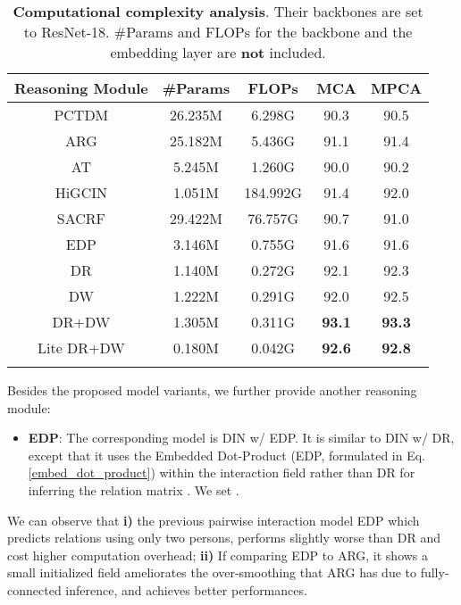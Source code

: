 \documentclass[10pt,twocolumn,letterpaper]{article}
\begin{document}
\begin{table}[t]
\small
  \centering
    \begin{tabular}{c|cccc}
    \Xhline{1.0pt}
    {Reasoning Module} & \#Params & FLOPs & MCA & MPCA \\
    \hline\hline
    PCTDM \cite{yan2018pctdm} & 26.235M  & 6.298G  & 90.3  & 90.5  \\
    ARG \cite{wu2019learning}   & 25.182M  & 5.436G  & 91.1  & 91.4  \\
    AT \cite{gavrilyuk2020actor} & 5.245M  & 1.260G  & 90.0  & 90.2  \\
    HiGCIN\cite{yan2020higcin} & 1.051M  & 184.992G  & 91.4  & 92.0  \\
    SACRF \cite{pramono2020eccvempowering} & 29.422M  & 76.757G  & 90.7  & 91.0  \\
    \hline
    EDP    & 3.146M  & 0.755G  & 91.6  & 91.6  \\
    DR    & 1.140M  & 0.272G  & 92.1  & 92.3  \\
    DW   & 1.222M  & 0.291G  & 92.0  & 92.5  \\
    DR+DW & 1.305M  & 0.311G  & \textbf{93.1} & \textbf{93.3} \\
    Lite DR+DW & 0.180M  & 0.042G  & \textbf{92.6}  & \textbf{92.8}  \\
    \Xhline{1.0pt}
    \end{tabular}\vspace{0.2cm}
  \caption{\textbf{Computational complexity analysis}. Their backbones are set to ResNet-18. \#Params and FLOPs for the backbone and the embedding layer are \textbf{not} included.}
  \label{comptational_complx}\end{table}


Besides the proposed model variants, we further provide another reasoning module:
\begin{itemize}[noitemsep,topsep=0pt,parsep=0pt,partopsep=0pt]
    \item \textbf{EDP}: The corresponding model is DIN w/ EDP. It is similar to DIN w/ DR, except that it uses the Embedded Dot-Product (EDP, formulated in Eq.\ref{embed_dot_product}) within the interaction field rather than DR for inferring the relation matrix . We set .
\end{itemize}
We can observe that \textbf{i)} the previous pairwise interaction model EDP which predicts relations using only two persons, performs slightly worse than DR and cost higher computation overhead; \textbf{ii)} If comparing EDP to ARG, it shows a small initialized field ameliorates the over-smoothing that ARG has due to fully-connected inference, and achieves better performances.
\end{document}

